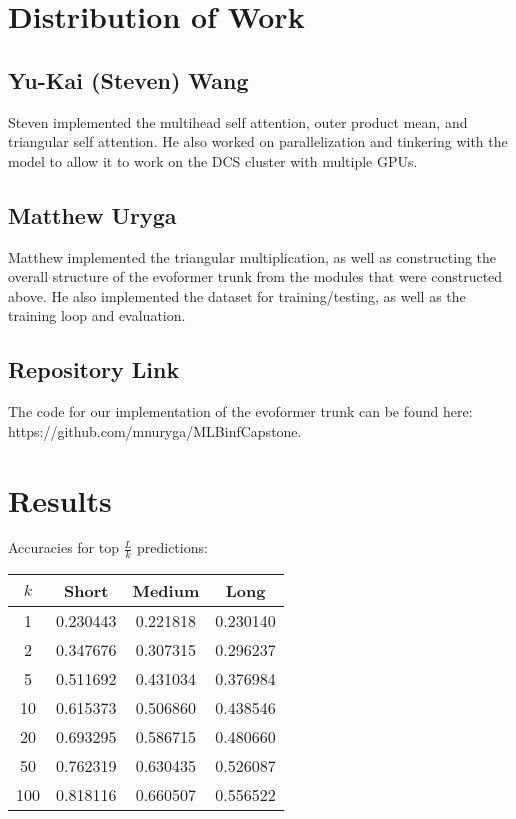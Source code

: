 \documentclass[11pt]{article}
\begin{document}
\section{Distribution of Work}
\subsection{Yu-Kai (Steven) Wang}
Steven implemented the multihead self attention, outer product mean, and triangular self attention.  He also worked on parallelization and tinkering with the model to allow it to work on the DCS cluster with multiple GPUs.

\subsection{Matthew Uryga}
Matthew implemented the triangular multiplication, as well as constructing the overall structure of the evoformer trunk from the modules that were constructed above.  He also implemented the dataset for training/testing, as well as the training loop and evaluation.

\subsection{Repository Link}
The code for our implementation of the evoformer trunk can be found here:\\https://github.com/mnuryga/MLBinfCapstone.
\\[4mm]

\section{Results}
Accuracies for top $\frac{L}{k}$ predictions:\\[4mm]
\begin{tabular}{c|c|c|c}
$k$ & Short & Medium & Long\\
\hline
1   & 0.230443 & 0.221818 & 0.230140\\
2   & 0.347676 & 0.307315 & 0.296237\\
5   & 0.511692 & 0.431034 & 0.376984\\
10  & 0.615373 & 0.506860 & 0.438546\\
20  & 0.693295 & 0.586715 & 0.480660\\
50  & 0.762319 & 0.630435 & 0.526087\\
100 & 0.818116 & 0.660507 & 0.556522
\end{tabular}\\[6mm]
\end{document}
